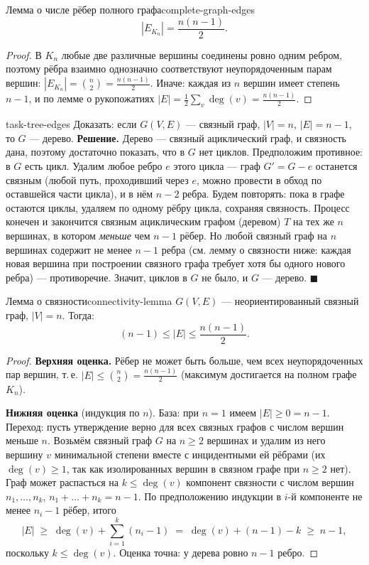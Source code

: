 \begin{statement}{Лемма о числе рёбер полного графа}{complete-graph-edges}
\[
  |E_{K_n}| = \frac{n(n-1)}{2}.
\]
\end{statement}

\begin{proof}
В $K_n$ любые две различные вершины соединены ровно одним ребром, поэтому
рёбра взаимно однозначно соответствуют неупорядоченным парам вершин:
$|E_{K_n}| = \binom{n}{2} = \frac{n(n-1)}{2}$. Иначе: каждая из $n$ вершин
имеет степень $n-1$, и по лемме о рукопожатиях
$|E| = \frac{1}{2}\sum_v \deg(v) = \frac{n(n-1)}{2}$.
\end{proof}

\begin{task}{}{task-tree-edges}
Доказать: если $G(V, E)$ --- связный граф, $|V| = n$, $|E| = n - 1$,
то $G$ --- дерево.
\tcblower
\textbf{Решение.} Дерево --- связный ациклический граф, и связность дана,
поэтому достаточно показать, что в $G$ нет циклов. Предположим противное:
в $G$ есть цикл. Удалим любое ребро $e$ этого цикла --- граф
$G' = G - e$ останется связным (любой путь, проходивший через $e$, можно
провести в обход по оставшейся части цикла), и в нём $n - 2$ ребра.
Будем повторять: пока в графе остаются циклы, удаляем по одному
рёбру цикла, сохраняя связность. Процесс конечен и закончится связным
ациклическим графом (деревом) $T$ на тех же $n$ вершинах, в котором
\emph{меньше} чем $n-1$ рёбер. Но любой связный граф на $n$ вершинах
содержит не менее $n - 1$ ребра (см. лемму о связности ниже: каждая новая
вершина при построении связного графа требует хотя бы одного нового ребра)
--- противоречие. Значит, циклов в $G$ не было, и $G$ --- дерево.
$\blacksquare$
\end{task}

\begin{statement}{Лемма о связности}{connectivity-lemma}
$G(V, E)$ --- неориентированный связный граф, $|V| = n$. Тогда:
\[
  (n - 1) \leq |E| \leq \frac{n(n-1)}{2}.
\]
\end{statement}

\begin{proof}
\textbf{Верхняя оценка.} Рёбер не может быть больше, чем всех
неупорядоченных пар вершин, т.\,е. $|E| \le \binom{n}{2} =
\frac{n(n-1)}{2}$ (максимум достигается на полном графе $K_n$).

\textbf{Нижняя оценка} (индукция по $n$). База: при $n = 1$ имеем
$|E| \ge 0 = n - 1$. Переход: пусть утверждение верно для всех связных
графов с числом вершин меньше $n$. Возьмём связный граф $G$ на $n \ge 2$
вершинах и удалим из него вершину $v$ минимальной степени вместе с
инцидентными ей рёбрами (их $\deg(v) \ge 1$, так как изолированных вершин
в связном графе при $n \ge 2$ нет). Граф может распасться на
$k \le \deg(v)$ компонент связности с числом вершин $n_1, \dots, n_k$,
$n_1 + \dots + n_k = n - 1$. По предположению индукции в $i$-й компоненте
не менее $n_i - 1$ рёбер, итого
\[
  |E| \;\ge\; \deg(v) + \sum_{i=1}^{k}(n_i - 1)
  \;=\; \deg(v) + (n - 1) - k \;\ge\; n - 1,
\]
поскольку $k \le \deg(v)$. Оценка точна: у дерева ровно $n-1$ ребро.
\end{proof}
